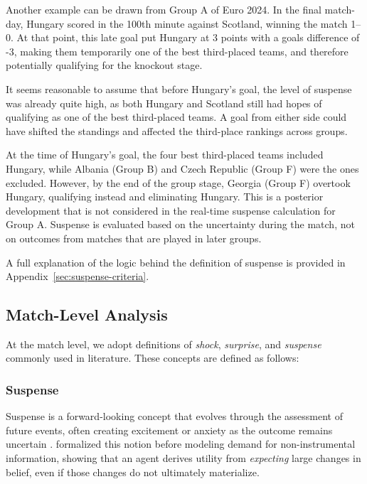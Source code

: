 \documentclass[11pt]{article}
\begin{document}
Another example can be drawn from Group A of Euro 2024. In the final match-day, Hungary scored in the 100th minute against Scotland, winning the match 1–0. At that point, this late goal put Hungary at 3 points with a goals difference of -3, making them temporarily one of the best third-placed teams, and therefore potentially qualifying for the knockout stage.

It seems reasonable to assume that before Hungary's goal, the level of suspense was already quite high, as both Hungary and Scotland still had hopes of qualifying as one of the best third-placed teams. A goal from either side could have shifted the standings and affected the third-place rankings across groups.

At the time of Hungary’s goal, the four best third-placed teams included Hungary, while Albania (Group B) and Czech Republic (Group F) were the ones excluded. However, by the end of the group stage, Georgia (Group F) overtook Hungary, qualifying instead and eliminating Hungary. This is a posterior development that is not considered in the real-time suspense calculation for Group A. Suspense is evaluated based on the uncertainty during the match, not on outcomes from matches that are played in later groups.

A full explanation of the logic behind the definition of suspense is provided in Appendix~\ref{sec:suspense-criteria}.


\subsection*{Match-Level Analysis}

At the match level, we adopt definitions of \textit{shock}, \textit{surprise}, and \textit{suspense} commonly used in literature. These concepts are defined as follows:


\subsubsection*{Suspense}

Suspense is a forward-looking concept that evolves through the assessment of future events, often creating excitement or anxiety as the outcome remains uncertain \citep{bizzozero2016importance}. \citet{ely2015suspense} formalized this notion before modeling demand for non-instrumental information, showing that an agent derives utility from \textit{expecting} large changes in belief, even if those changes do not ultimately materialize.
\end{document}
